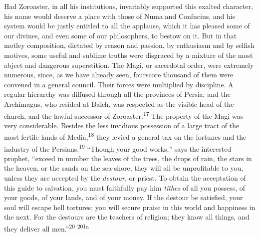 Had Zoroaster, in all his institutions, invariably supported this
exalted character, his name would deserve a place with those of
Numa and Confucius, and his system would be justly entitled to
all the applause, which it has pleased some of our divines, and
even some of our philosophers, to bestow on it. But in that
motley composition, dictated by reason and passion, by enthusiasm
and by selfish motives, some useful and sublime truths were
disgraced by a mixture of the most abject and dangerous
superstition. The Magi, or sacerdotal order, were extremely
numerous, since, as we have already seen, fourscore thousand of
them were convened in a general council. Their forces were
multiplied by discipline. A regular hierarchy was diffused
through all the provinces of Persia; and the Archimagus, who
resided at Balch, was respected as the visible head of the
church, and the lawful successor of Zoroaster.\textsuperscript{17} The property of
the Magi was very considerable. Besides the less invidious
possession of a large tract of the most fertile lands of Media,\textsuperscript{18}
they levied a general tax on the fortunes and the industry of
the Persians.\textsuperscript{19} “Though your good works,” says the interested
prophet, “exceed in number the leaves of the trees, the drops of
rain, the stars in the heaven, or the sands on the sea-shore,
they will all be unprofitable to you, unless they are accepted by
the \textit{destour}, or priest. To obtain the acceptation of this guide
to salvation, you must faithfully pay him \textit{tithes} of all you
possess, of your goods, of your lands, and of your money. If the
destour be satisfied, your soul will escape hell tortures; you
will secure praise in this world and happiness in the next. For
the destours are the teachers of religion; they know all things,
and they deliver all men.”\textsuperscript{20} \textsuperscript{201a}




